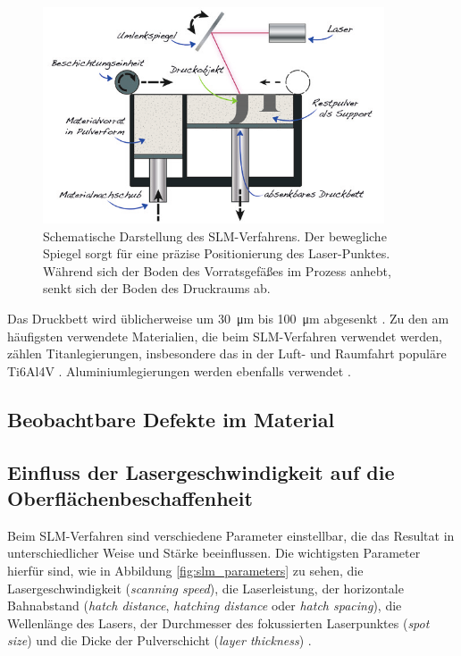 		\begin{figure}[ht]
			\centering
			\includegraphics[width=0.9\textwidth]{chapter/main/img/SLS_SLM.png}
			\caption[Schematische Darstellung des SLM-Verfahrens]{Schematische Darstellung des
			SLM-Verfahrens. Der bewegliche Spiegel sorgt für eine präzise Positionierung des
			Laser-Punktes. Während sich der Boden des Vorrats\-gefäßes im Prozess anhebt, senkt
			sich der Boden des Druckraums ab. \cite[S. 119]{horsch20143d}}
			\label{fig:slm_sls}
		\end{figure}

		Das Druckbett wird üblicherweise um \SI{30}{\micro\meter} bis \SI{100}{\micro\meter}
		abgesenkt \cite{song2012effects}. Zu den am häufigsten verwendete Materialien, die beim
		SLM-Verfahren verwendet werden, zählen Titanlegierungen, insbesondere das in der Luft- und
		Raumfahrt populäre Ti6Al4V \cite{sadali2020influence,song2012effects,brandl2012morphology}.
		Aluminiumlegierungen werden ebenfalls verwendet
		\cite[je Al-Si-10Mg]{yan2020comparative,zou2017study}.

	\subsection{Beobachtbare Defekte im Material}

	\subsection{Einfluss der Lasergeschwindigkeit auf die Oberflächenbeschaffenheit}
		Beim SLM-Verfahren sind verschiedene Parameter einstellbar, die das Resultat in
		unterschiedlicher Weise und Stärke beeinflussen. Die wichtigsten Parameter hierfür sind,
		wie in Abbildung \ref{fig:slm_parameters} zu sehen, die Lasergeschwindigkeit
		(\emph{scanning speed}), die Laserleistung, der horizontale Bahnabstand
		(\emph{hatch distance}, \emph{hatching distance} oder \emph{hatch spacing}), die
		Wellenlänge des Lasers, der Durchmesser des fokussierten Laserpunktes
		(\emph{spot size}) und die Dicke der Pulverschicht (\emph{layer thickness})
		\cite{sadali2020influence}.

